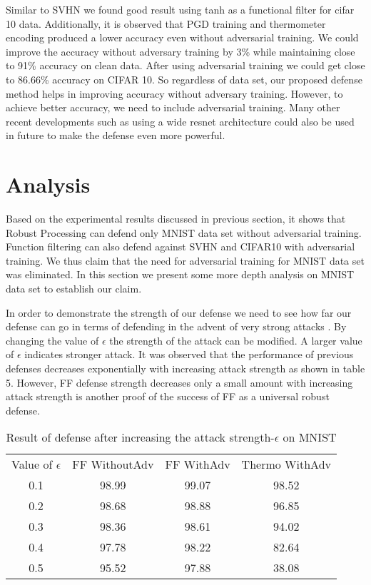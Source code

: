 \documentclass[conference]{IEEEtran}
\begin{document}
Similar to SVHN we found good result using tanh as a functional filter for cifar 10 data. Additionally, it is observed that PGD training and thermometer encoding produced a lower accuracy even without adversarial training. We could improve the accuracy without adversary training by 3\% while maintaining close to 91\% accuracy on clean data. After using adversarial training we could get close to 86.66\% accuracy on CIFAR 10. So regardless of data set, our proposed defense method helps in improving accuracy without adversary training. However, to achieve better accuracy, we need to include adversarial training. Many other recent developments such as using a wide resnet architecture could also be used in future to make the defense even more powerful.

\section{Analysis}

Based on the experimental results discussed in previous section, it shows that Robust Processing can defend only MNIST data set without adversarial training. Function filtering can also defend against SVHN and CIFAR10 with adversarial training. We thus claim that the need for adversarial training for MNIST data set was eliminated. In this section we present some more depth analysis on MNIST data set to establish our claim.


In order to demonstrate the strength of our defense we need to see how far our defense can go in terms of defending in the advent of very strong attacks \cite{mkadry2017towards,anonymous2018thermometer}. By changing the value of $\epsilon$ the strength of the attack can be modified. A larger value of $\epsilon$ indicates stronger attack. It was observed that the performance of previous defenses decreases exponentially with increasing attack strength as shown in table 5. However, FF defense strength decreases only a small amount with increasing attack strength is another proof of the success of FF as a universal robust defense.

\begin{table}[h]
\centering
\caption{Result of defense after increasing the attack strength-$\epsilon$ on MNIST}

\begin{tabular}{ |c|c|c|c| } 
 \hline
 Value of $\epsilon$ & FF WithoutAdv & FF WithAdv & Thermo WithAdv \\ 
 0.1 & 98.99 & 99.07 & 98.52 \\
 0.2 & 98.68 & 98.88 & 96.85 \\ 
 0.3 & 98.36 & 98.61 & 94.02 \\
 0.4 & 97.78 & 98.22 & 82.64 \\ 
 0.5 & 95.52 & 97.88 & 38.08 \\
 \hline
\end{tabular}
\end{table}
\end{document}
